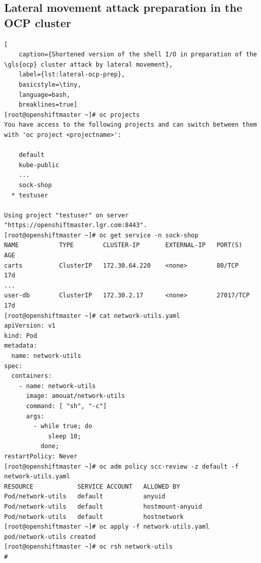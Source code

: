 \subsection{Lateral movement attack preparation in the OCP cluster}
\begin{lstlisting}[
	caption={Shortened version of the shell I/O in preparation of the \gls{ocp} cluster attack by lateral movement},
	label={lst:lateral-ocp-prep},
	basicstyle=\tiny,
	language=bash,
	breaklines=true]
[root@openshiftmaster ~]# oc projects
You have access to the following projects and can switch between them with 'oc project <projectname>':

    default
    kube-public
    ...
    sock-shop
  * testuser

Using project "testuser" on server "https://openshiftmaster.lgr.com:8443".
[root@openshiftmaster ~]# oc get service -n sock-shop
NAME           TYPE        CLUSTER-IP       EXTERNAL-IP   PORT(S)        AGE
carts          ClusterIP   172.30.64.220    <none>        80/TCP         17d
...
user-db        ClusterIP   172.30.2.17      <none>        27017/TCP      17d
[root@openshiftmaster ~]# cat network-utils.yaml
apiVersion: v1
kind: Pod
metadata:
  name: network-utils
spec:
  containers:
    - name: network-utils
      image: amouat/network-utils
      command: [ "sh", "-c"]
      args:
        - while true; do
            sleep 10;
          done;
restartPolicy: Never
[root@openshiftmaster ~]# oc adm policy scc-review -z default -f network-utils.yaml
RESOURCE            SERVICE ACCOUNT   ALLOWED BY
Pod/network-utils   default           anyuid
Pod/network-utils   default           hostmount-anyuid
Pod/network-utils   default           hostnetwork
[root@openshiftmaster ~]# oc apply -f network-utils.yaml
pod/network-utils created
[root@openshiftmaster ~]# oc rsh network-utils
# 
\end{lstlisting}

\newpage
